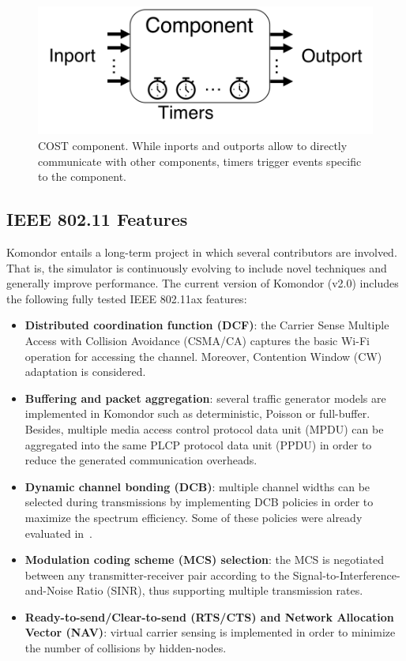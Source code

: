 \documentclass[conference]{IEEEtran}
\begin{document}
	\begin{figure}[t]
		\centering
		\includegraphics[width=0.7\columnwidth]{cost_component.png}
		\caption{COST component. While inports and outports allow to directly communicate with other components, timers trigger events specific to the component.}
		\label{fig:cost}
	\end{figure}	
	
	
	\subsection{IEEE 802.11 Features}
	\label{subsection:features}
	Komondor entails a long-term project in which several contributors are involved. That is, the simulator is continuously evolving to include novel techniques and generally improve performance. The current version of Komondor (v2.0) includes the following fully tested IEEE 802.11ax features:
	\begin{itemize}
		\item \textbf{Distributed coordination function (DCF)}: the Carrier Sense Multiple Access with Collision Avoidance (CSMA/CA) captures the basic Wi-Fi operation for accessing the channel. Moreover, Contention Window (CW) adaptation is considered.
		\item \textbf{Buffering and packet aggregation}: several traffic generator models are implemented in Komondor such as deterministic, Poisson or full-buffer. Besides, multiple media access control protocol data unit (MPDU) can be aggregated into the same PLCP protocol data unit (PPDU) in order to reduce the generated communication overheads.
		\item \textbf{Dynamic channel bonding (DCB)}: multiple channel widths can be selected during transmissions by implementing DCB policies in order to maximize the spectrum efficiency. Some of these policies were already evaluated in~\cite{barrachina2018performance, barrachina2018overlap}.
		\item\textbf{Modulation coding scheme (MCS) selection}: the MCS is negotiated between any transmitter-receiver pair according to the Signal-to-Interference-and-Noise Ratio (SINR), thus supporting multiple transmission rates.
		\item \textbf{Ready-to-send/Clear-to-send (RTS/CTS) and Network Allocation Vector (NAV)}: virtual carrier sensing is implemented in order to minimize the number of collisions by hidden-nodes.
	\end{itemize}
	
\end{document}
